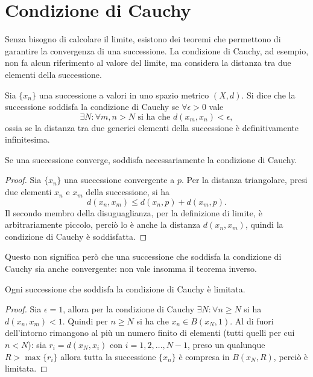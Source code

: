 \section{Condizione di Cauchy}
Senza bisogno di calcolare il limite, esistono dei teoremi che permettono di garantire la convergenza di una successione. La condizione di Cauchy, ad esempio, non fa alcun riferimento al valore del limite, ma considera la distanza tra due elementi della successione.
\begin{definizione}
\label{d:ccauchy_successioni}
Sia $\{x_n\}$ una successione a valori in uno spazio metrico $(X,d)$. Si dice che la successione soddisfa la condizione di Cauchy se $\forall\epsilon>0$ vale
\begin{equation}
\label{eq:ccauchy_successioni}
\exists N\colon\forall m,n>N\text{ si ha che }d(x_m,x_n)<\epsilon,
\end{equation}
ossia se la distanza tra due generici elementi della successione è definitivamente infinitesima.
\end{definizione}
\begin{osservazione}
Se una successione converge, soddisfa necessariamente la condizione di Cauchy.
\end{osservazione}
\begin{proof}
Sia $\{x_n\}$ una successione convergente a $p$. Per la distanza triangolare, presi due elementi $x_n$ e $x_m$ della successione, si ha
\[
d(x_n,x_m)\leq d(x_n,p)+d(x_m,p).
\]
Il secondo membro della disuguaglianza, per la definizione di limite, è arbitrariamente piccolo, perciò lo è anche la distanza $d(x_n,x_m)$, quindi la condizione di Cauchy è soddisfatta.
\end{proof}
Questo non significa però che una successione che soddisfa la condizione di Cauchy sia anche convergente: non vale insomma il teorema inverso.
\begin{osservazione}
Ogni successione che soddisfa la condizione di Cauchy è limitata.
\end{osservazione}
\begin{proof}
Sia $\epsilon=1$, allora per la condizione di Cauchy $\exists N\colon\forall n\geq N$ si ha $d(x_n,x_m)<1$. Quindi per $n\geq N$ si ha che $x_n\in B(x_N,1)$. Al di fuori dell'intorno rimangono al più un numero finito di elementi (tutti quelli per cui $n<N$): sia $r_i=d(x_N,x_i)$ con $i=1,2,\dots,N-1$, preso un qualunque $R>\max\{r_i\}$ allora tutta la successione $\{x_n\}$ è compresa in $B(x_N,R)$, perciò è limitata.
\end{proof}
